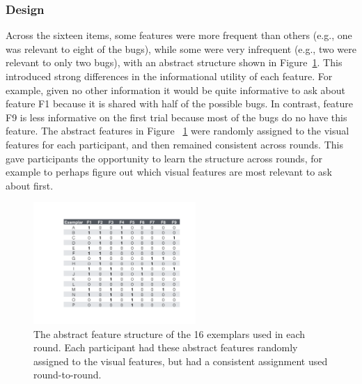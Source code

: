 \documentclass[man,floatsintext]{apa6}
\begin{document}
\subsubsection{Design}

Across the sixteen items, some features were more frequent than others (e.g., one was relevant to eight of the  bugs), while some were very infrequent (e.g., two were relevant to only two bugs), with an
abstract structure shown in Figure~\ref{fig:feature_table}. This introduced
strong differences in the informational utility of each feature.  For example,
given no other information it would be quite informative to ask about feature F1
because it is shared with half of the possible bugs.  In contrast, feature
F9 is less informative on the first trial because most of the bugs do no have this
feature. The abstract features in Figure~
\ref{fig:feature_table} were randomly assigned to the visual features for each 
participant, and then remained consistent across rounds. This gave participants the 
opportunity to learn the structure across rounds, for example to perhaps figure out 
which visual features are most relevant to ask about first.

\begin{figure}[h]
  \centering
  \includegraphics[width=0.55\textwidth]{figures/feature_table}
  \caption{The abstract feature structure of the 16 exemplars used in each round. 
Each participant had these abstract features randomly assigned to the visual 
features, but had a consistent assignment used round-to-round.}
  \label{fig:feature_table}
\end{figure} 
\end{document}
